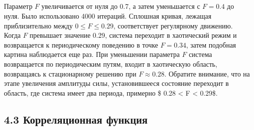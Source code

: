 \documentclass[11pt]{article}
\begin{document}
    \begin{center}
    \end{center}
    { \hspace*{\fill} \\}
    
    \begin{center}
    \end{center}
    { \hspace*{\fill} \\}
    
    \begin{center}
    \end{center}
    { \hspace*{\fill} \\}
    
    \begin{center}
    \end{center}
    { \hspace*{\fill} \\}
    
    Параметр \(F\) увеличивается от нуля до 0.7, а затем уменьшается с
\(F = 0.4\) до нуля. Было использовано 4000 итераций. Сплошная кривая,
лежащая приблизительно между \(0 \leq F \leq 0.29\), соответствует
регулярному движению. Когда \(F\) превышает значение 0.29, система
переходит в хаотический режим и возвращается к периодическому поведению
в точке \(F = 0.34\), затем подобная картина наблюдается еще раз. При
уменьшении параметра \(F\) система возвращается по периодическим путям,
входит в хаотическую область, возвращаясь к стационарному решению при
\(F \approx 0.28\). Обратите внимание, что на этапе увеличения амплитуды
силы, установившееся состояние переходит в область, где система имеет
два периода, примерно \$ 0.28 \textless{} F \textless{} 0.29\$.

    \hypertarget{ux43aux43eux440ux440ux435ux43bux44fux446ux438ux43eux43dux43dux430ux44f-ux444ux443ux43dux43aux446ux438ux44f}{%
\subsection{4.3 Корреляционная
функция}\label{ux43aux43eux440ux440ux435ux43bux44fux446ux438ux43eux43dux43dux430ux44f-ux444ux443ux43dux43aux446ux438ux44f}}
\end{document}
